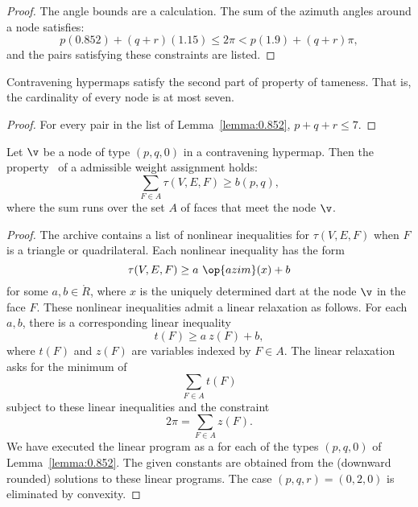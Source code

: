 \begin{proof}
The angle bounds are a calculation.  The sum of the azimuth angles
around a node satisfies:
\[ 
p (0.852) + (q+r) (1.15) \le 2\pi < p (1.9) + (q+r) \pi,
\] 
and the pairs satisfying these constraints are listed.
\end{proof}

\begin{lemma}[]\label{lemma:node-upper}
Contravening hypermaps satisfy the second part of property 
of tameness.  That is, the cardinality of every
node is at most seven.
\end{lemma}

\begin{proof}  For every pair in the list of Lemma~\ref{lemma:0.852},  $p+q+r\le 7$.
\end{proof}




\begin{lemma}[] \label{lemma:weightB}
  Let $\v$ be a node of type $(p,q,0)$ in a contravening hypermap.
  Then the property~ of a admissible weight assignment
  holds:
\[ 
\sum_{ F\in A} \tau(V,E,F) \ge  b(p,q),
\] 
where the sum runs over the set $A$ of faces that meet the node $\v$.
\end{lemma}
%
%

\begin{proof}   The archive
  \cite[FUSDSPJ]{website:FlyspeckProject} contains a list of nonlinear
  inequalities for $\tau(V,E,F)$ when $F$ is a triangle or
  quadrilateral. Each nonlinear inequality has the form
\[ \tau(V,E,F) \ge a~\op{azim}(x) + b\] 
for some $a,b\in\ring{R}$, where $x$ is the uniquely determined dart
at the node $\v$ in the face $F$.  These nonlinear inequalities admit
a linear relaxation as follows.  For each $a,b$, there is a corresponding
linear inequality %
%
\[ 
t(F) \ge a~z(F) + b,
\] 
where $t(F)$ and $z(F)$ are variables indexed by $F\in A$.
%
%
%
The linear relaxation asks for the minimum of 
\[ \sum_{F\in A} t(F)\] 
subject to these linear inequalities and the constraint
\[ 
2\pi = \sum_{F\in A} z(F).
\] 
We have executed the linear program as a 
for each of the
types $(p,q,0)$ of Lemma~\ref{lemma:0.852}. The given constants are
obtained from the (downward rounded) solutions to these linear
programs.  The case $(p,q,r)=(0,2,0)$ is eliminated by convexity.
\end{proof}

